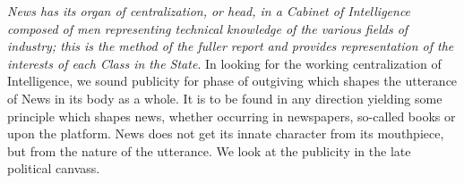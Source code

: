 \documentclass[openany,nobib]{tufte-book}
\begin{document}
\vspace{0.05in}

\emph{News has its organ of centralization, or head, in a Cabinet of
Intelligence composed of men representing technical knowledge of the
various fields of industry; this is the method of the fuller report and
provides representation of the interests of each Class in the State}. In
looking for the working centralization of Intelligence, we sound
publicity for phase of outgiving which shapes the utterance of News in
its body as a whole. It is to be found in any direction yielding some
principle which shapes news, whether occurring in newspapers, so-called
books or upon the platform. News does not get its innate character from
its mouthpiece, but from the nature of the utterance. We look at the
publicity in the late political canvass.~
\end{document}
